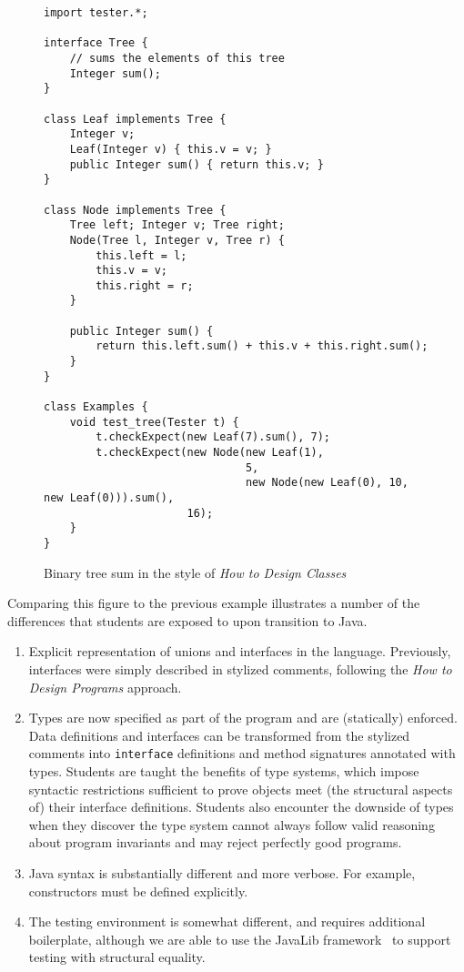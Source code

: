 \documentclass[submission,copyright]{eptcs}
\def\htdp{\emph{How to Design Programs}\xspace}
\begin{document}
\begin{figure}
\begin{verbatim}
import tester.*;

interface Tree {
    // sums the elements of this tree
    Integer sum();
}

class Leaf implements Tree {
    Integer v;
    Leaf(Integer v) { this.v = v; }
    public Integer sum() { return this.v; }
}

class Node implements Tree {
    Tree left; Integer v; Tree right;
    Node(Tree l, Integer v, Tree r) {
        this.left = l;
        this.v = v;
        this.right = r;
    }

    public Integer sum() {
        return this.left.sum() + this.v + this.right.sum();
    }
}

class Examples {
    void test_tree(Tester t) {
        t.checkExpect(new Leaf(7).sum(), 7);
        t.checkExpect(new Node(new Leaf(1),
                               5, 
                               new Node(new Leaf(0), 10, new Leaf(0))).sum(),
                      16);
    }
}
\end{verbatim}
\caption{Binary tree sum in the style of \emph{How to Design Classes}}
\label{fig:java}
\end{figure}

Comparing this figure to the previous example illustrates a number of the
differences that students are exposed to upon transition to Java.

\begin{enumerate}
\item Explicit representation of unions and interfaces in the
  language.  Previously, interfaces were simply described in stylized
  comments, following the \htdp approach.
\item Types are now specified as part of the program and are
  (statically) enforced.  Data definitions and interfaces can be
  transformed from the stylized comments into {\tt interface}
  definitions and method signatures annotated with types.  Students
  are taught the benefits of type systems, which impose syntactic
  restrictions sufficient to prove objects meet (the structural
  aspects of) their interface definitions.  Students also encounter
  the downside of types when they discover the type system cannot
  always follow valid reasoning about program invariants and may reject
  perfectly good programs.
\item Java syntax is substantially different and more verbose. For
  example, constructors must be defined explicitly.
\item The testing environment is somewhat different, and requires
  additional boilerplate, although we are
  able to use the JavaLib framework~\cite{local:java-world} to support testing with
  structural equality.
\end{enumerate}
\end{document}
